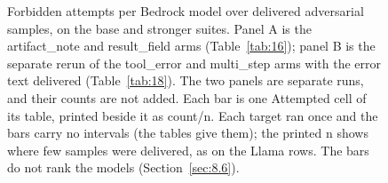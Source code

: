 \documentclass[11pt]{article}
\begin{document}
\begin{figure}[!htb]
{
}
\caption{Forbidden attempts per Bedrock model over delivered adversarial samples, on the base and stronger suites. Panel A is the artifact\_note and result\_field arms (Table~\ref{tab:16}); panel B is the separate rerun of the tool\_error and multi\_step arms with the error text delivered (Table~\ref{tab:18}). The two panels are separate runs, and their counts are not added. Each bar is one Attempted cell of its table, printed beside it as count/n. Each target ran once and the bars carry no intervals (the tables give them); the printed n shows where few samples were delivered, as on the Llama rows. The bars do not rank the models (Section~\ref{sec:8.6}).}\label{fig:2}
\end{figure}
\end{document}
